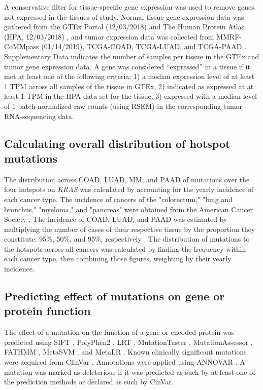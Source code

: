 \documentclass[english, 10pt, letterpaper]{article}
\newcommand{\KRAS}{\emph{KRAS}}
\begin{document}
A conservative filter for tissue-specific gene expression was used to remove genes not expressed in the tissues of study. 
Normal tissue gene expression data was gathered from the GTEx Portal (12/03/2018) \cite{GTExConsortium2017} and The Human Protein Atlas (HPA, 12/03/2018) \cite{Uhlen2015, Uhlen2016}, and tumor expression data was collected from MMRF-CoMMpass (01/14/2019), TCGA-COAD, TCGA-LUAD, and TCGA-PAAD \cite{Walker2019AAnalysis., CancerGenomeAtlasNetwork2012, CancerGenomeAtlasResearchNetwork2014, CancerGenomeAtlasResearchNetwork.Electronicaddress:andrew_aguirredfci.harvard.edu2017}. 
Supplementary Data indicates the number of samples per tissue in the GTEx and tumor gene expression data.
A gene was considered “expressed” in a tissue if it met at least one of the following criteria: 1) a median expression level of at least 1 TPM across all samples of the tissue in GTEx, 2) indicated as expressed at at least 1 TPM in the HPA data set for the tissue, 3) expressed with a median level of 1 batch-normalized raw counts (using RSEM) in the corresponding tumor RNA-sequencing data.


\subsection*{Calculating overall distribution of hotspot mutations}
The distribution across COAD, LUAD, MM, and PAAD of mutations over the four hotspots on \KRAS{} was calculated by accounting for the yearly incidence of each cancer type.
The incidence of cancers of the "colorectum," "lung and bronchus," "myeloma," and "pancreas" were obtained from the American Cancer Society \cite{Siegel2020Cancer2020.}.
The incidence of COAD, LUAD, and PAAD was estimated by multiplying the number of cases of their respective tissue by the proportion they constitute: 95\%, 50\%, and 95\%, respectively \cite{Siegel2020Cancer2020., Meza2015Lung1973-2010.}.
The distribution of mutations to the hotspots across all cancers was calculated by finding the frequency within each cancer type, then combining those figures, weighting by their yearly incidence.


\subsection*{Predicting effect of mutations on gene or protein function}

The effect of a mutation on the function of a gene or encoded protein was predicted using SIFT \cite{Kumar2009, Vaser2016}, PolyPhen2 \cite{Adzhubei2010}, LRT \cite{Chun2009IdentificationGenomes.}, MutationTaster \cite{Schwarz2014MutationTaster2:Age.}, MutationAssessor \cite{Reva2007DeterminantsOptimization., Reva2011}, FATHMM \cite{Shihab2013}, MetaSVM \cite{Dong2015ComparisonStudies.}, and MetaLR \cite{Dong2015ComparisonStudies.}.
Known clinically significant mutations were acquired from ClinVar \cite{Landrum2018ClinVar:Evidence.}.
Annotations were applied using ANNOVAR \cite{Wang2010ANNOVAR:Data.}.
A mutation was marked as deleterious if it was predicted as such by at least one of the prediction methods or declared as such by CinVar.
\end{document}
